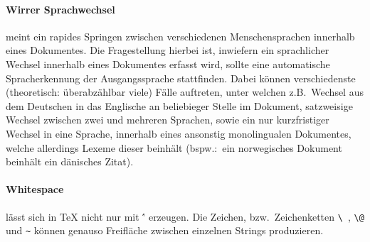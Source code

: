 \paragraph*{Wirrer Sprachwechsel} meint ein rapides Springen zwischen verschiedenen Menschensprachen innerhalb eines Dokumentes. Die Fragestellung hierbei ist, inwiefern ein sprachlicher Wechsel innerhalb eines Dokumentes erfasst wird, sollte eine automatische Spracherkennung der Ausgangssprache stattfinden. Dabei können verschiedenste (theoretisch: überabzählbar viele) Fälle auftreten, unter welchen z.B.\ Wechsel aus dem Deutschen in das Englische an beliebieger Stelle im Dokument, satzweisige Wechsel zwischen zwei und mehreren Sprachen, sowie ein nur kurzfristiger Wechsel in eine Sprache, innerhalb eines ansonstig monolingualen Dokumentes, welche allerdings Lexeme dieser beinhält (bspw.:\ ein norwegisches Dokument beinhält ein dänisches Zitat).

\paragraph*{Whitespace} lässt sich in \TeX{} nicht nur mit \' ' erzeugen. Die Zeichen, bzw.\ Zeichenketten \verb|\ |, \verb|\@| und \verb|~| können genauso Freifläche zwischen einzelnen Strings produzieren.
